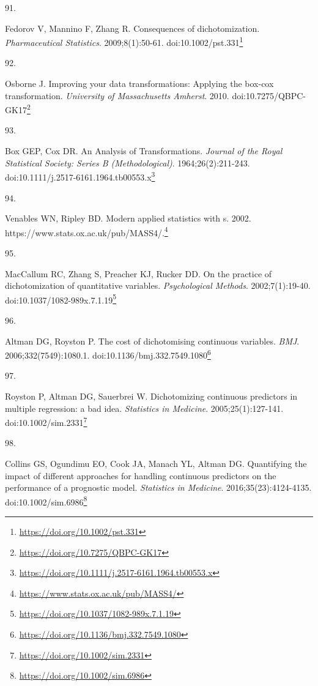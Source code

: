 \documentclass[
  a4paper,
]{book}
\newlength{\cslhangindent}
\newlength{\csllabelwidth}
\newlength{\cslentryspacingunit} %
\newenvironment{CSLReferences}[2] %
 {%
  \setlength{\parindent}{0pt}
  \ifodd #1
  \let\oldpar\par
  \def\par{\hangindent=\cslhangindent\oldpar}
  \fi
  \setlength{\parskip}{#2\cslentryspacingunit}
 }%
 {}
\newcommand{\CSLLeftMargin}[1]{\parbox[t]{\csllabelwidth}{#1}}
\newcommand{\CSLRightInline}[1]{\parbox[t]{\linewidth - \csllabelwidth}{#1}\break}
\renewcommand{\href}[2]{#2\footnote{\url{#1}}}
\begin{document}
\begin{CSLReferences}{0}{0}
\leavevmode{}%
\CSLLeftMargin{91. }%
\CSLRightInline{Fedorov V, Mannino F, Zhang R. Consequences of dichotomization. \emph{Pharmaceutical Statistics}. 2009;8(1):50-61. doi:\href{https://doi.org/10.1002/pst.331}{10.1002/pst.331}}

\leavevmode{}%
\CSLLeftMargin{92. }%
\CSLRightInline{Osborne J. Improving your data transformations: Applying the box-cox transformation. \emph{University of Massachusetts Amherst}. 2010. doi:\href{https://doi.org/10.7275/QBPC-GK17}{10.7275/QBPC-GK17}}

\leavevmode{}%
\CSLLeftMargin{93. }%
\CSLRightInline{Box GEP, Cox DR. An Analysis of Transformations. \emph{Journal of the Royal Statistical Society: Series B (Methodological)}. 1964;26(2):211-243. doi:\href{https://doi.org/10.1111/j.2517-6161.1964.tb00553.x}{10.1111/j.2517-6161.1964.tb00553.x}}

\leavevmode{}%
\CSLLeftMargin{94. }%
\CSLRightInline{Venables WN, Ripley BD. Modern applied statistics with s. 2002. \href{https://www.stats.ox.ac.uk/pub/MASS4/}{https://www.stats.ox.ac.uk/pub/MASS4/.}}

\leavevmode{}%
\CSLLeftMargin{95. }%
\CSLRightInline{MacCallum RC, Zhang S, Preacher KJ, Rucker DD. On the practice of dichotomization of quantitative variables. \emph{Psychological Methods}. 2002;7(1):19-40. doi:\href{https://doi.org/10.1037/1082-989x.7.1.19}{10.1037/1082-989x.7.1.19}}

\leavevmode{}%
\CSLLeftMargin{96. }%
\CSLRightInline{Altman DG, Royston P. The cost of dichotomising continuous variables. \emph{BMJ}. 2006;332(7549):1080.1. doi:\href{https://doi.org/10.1136/bmj.332.7549.1080}{10.1136/bmj.332.7549.1080}}

\leavevmode{}%
\CSLLeftMargin{97. }%
\CSLRightInline{Royston P, Altman DG, Sauerbrei W. Dichotomizing continuous predictors in multiple regression: a bad idea. \emph{Statistics in Medicine}. 2005;25(1):127-141. doi:\href{https://doi.org/10.1002/sim.2331}{10.1002/sim.2331}}

\leavevmode{}%
\CSLLeftMargin{98. }%
\CSLRightInline{Collins GS, Ogundimu EO, Cook JA, Manach YL, Altman DG. Quantifying the impact of different approaches for handling continuous predictors on the performance of a prognostic model. \emph{Statistics in Medicine}. 2016;35(23):4124-4135. doi:\href{https://doi.org/10.1002/sim.6986}{10.1002/sim.6986}}


\end{CSLReferences}
\end{document}
